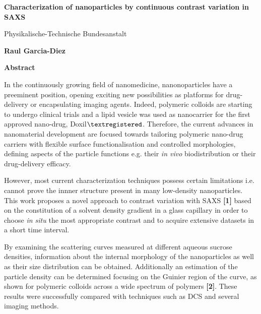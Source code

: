 

\thispagestyle{plain}
\begin{center}
    \Large
    \textbf{Characterization of nanoparticles by continuous contrast variation in SAXS}
    
    \vspace{0.4cm}
    \large
    Physikalische-Technische Bundesanstalt
    
    \vspace{0.4cm}
    \textbf{Raul Garcia-Diez}
    
    \vspace{0.9cm}
    \textbf{Abstract}
\end{center}

In the continuously growing field of nanomedicine, nanonoparticles have a preeminent position, opening exciting new possibilities as platforms for drug-delivery or encapsulating imaging agents. Indeed, polymeric colloids are starting to undergo clinical trials and a lipid vesicle was used as nanocarrier for the first approved nano-drug, Doxil$\textregistered$. Therefore, the current advances in nanomaterial development are focused towards tailoring polymeric nano-drug carriers with flexible surface functionalisation and controlled morphologies, defining aspects of the particle functions e.g. their \emph{in vivo} biodistribution or their drug-delivery efficacy. 

However, most current characterization techniques possess certain limitations i.e. cannot prove the innner structure present in many low-density nanoparticles. This work proposes a novel approach to contrast variation with SAXS \textbf{[1]} based on the constitution of a solvent density gradient in a glass capillary in order to choose \emph{in situ} the most appropriate contrast and to acquire extensive datasets in a short time interval.

By examining the scattering curves measured at different aqueous sucrose densities, information about the internal morphology of the nanoparticles as well as their size distribution can be obtained. Additionally an estimation of the particle density can be determined focusing on the Guinier region of the curve, as shown for polymeric colloids across a wide spectrum of polymers \textbf{[2]}. These results were successfully compared with techniques such as DCS and several imaging methods.


